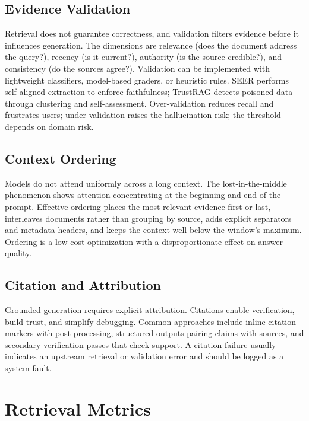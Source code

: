 \documentclass[11pt]{book}
\begin{document}
\subsection{Evidence Validation}

Retrieval does not guarantee correctness, and validation filters evidence before it influences generation. The dimensions are relevance (does the document address the query?), recency (is it current?), authority (is the source credible?), and consistency (do the sources agree?). Validation can be implemented with lightweight classifiers, model-based graders, or heuristic rules. SEER \cite{seer2024} performs self-aligned extraction to enforce faithfulness; TrustRAG \cite{trustrag} detects poisoned data through clustering and self-assessment. Over-validation reduces recall and frustrates users; under-validation raises the hallucination risk; the threshold depends on domain risk.

\subsection{Context Ordering}

Models do not attend uniformly across a long context. The lost-in-the-middle phenomenon \cite{liu2024lost} shows attention concentrating at the beginning and end of the prompt. Effective ordering places the most relevant evidence first or last, interleaves documents rather than grouping by source, adds explicit separators and metadata headers, and keeps the context well below the window's maximum. Ordering is a low-cost optimization with a disproportionate effect on answer quality.

\subsection{Citation and Attribution}

Grounded generation requires explicit attribution. Citations enable verification, build trust, and simplify debugging. Common approaches include inline citation markers with post-processing, structured outputs pairing claims with sources, and secondary verification passes that check support. A citation failure usually indicates an upstream retrieval or validation error and should be logged as a system fault.

\section{Retrieval Metrics}
\end{document}
